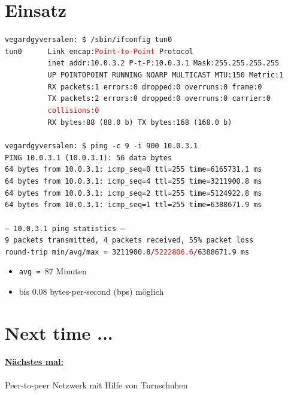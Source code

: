\documentclass{beamer}
\begin{document}
	\section{Einsatz}
	\begin{frame}[fragile=singleslide]
	\fontsize{8}{8}\selectfont
	\texttt{vegardgyversalen:~\$ /sbin/ifconfig tun0\\
tun0~~~~~~Link encap:\textcolor{red}{Point-to-Point} Protocol\\
~~~~~~~~~~inet addr:10.0.3.2  P-t-P:10.0.3.1  Mask:255.255.255.255\\
~~~~~~~~~~UP POINTOPOINT RUNNING NOARP MULTICAST  MTU:150  Metric:1\\
~~~~~~~~~~RX packets:1 errors:0 dropped:0 overruns:0 frame:0\\
~~~~~~~~~~TX packets:2 errors:0 dropped:0 overruns:0 carrier:0\\
~~~~~~~~~~\textcolor{red}{collisions:0}\\
~~~~~~~~~~RX bytes:88 (88.0 b)  TX bytes:168 (168.0 b)\\\hfill\\
vegardgyversalen:~\$ ping -c 9 -i 900 10.0.3.1\\
PING 10.0.3.1 (10.0.3.1): 56 data bytes\\
64 bytes from 10.0.3.1: icmp\_seq=0 ttl=255 time=6165731.1 ms\\
64 bytes from 10.0.3.1: icmp\_seq=4 ttl=255 time=3211900.8 ms\\
64 bytes from 10.0.3.1: icmp\_seq=2 ttl=255 time=5124922.8 ms\\
64 bytes from 10.0.3.1: icmp\_seq=1 ttl=255 time=6388671.9 ms\\\hfill\\
--- 10.0.3.1 ping statistics ---\\
9 packets transmitted, 4 packets received, 55\% packet loss\\
round-trip min/avg/max = 3211900.8/\textcolor{red}{5222806.6}/6388671.9 ms
}\normalsize\\
	\begin{itemize}
		\item \texttt{avg = }87 Minuten
		\item bis 0.08 bytes-per-second (bps) möglich
	\end{itemize}
	\end{frame}
	\section*{Next time ...}
	\begin{frame}
		\begin{center}
			\textbf{\underline{Nächstes mal:}}\\\hfill\\
			Peer-to-peer Netzwerk mit Hilfe von Turnschuhen
		\end{center}
	\end{frame}
\end{document}

